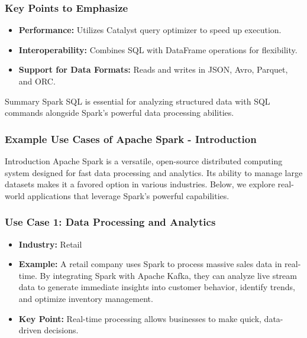 \documentclass[aspectratio=169]{beamer}
\begin{document}
\begin{frame}[fragile]
    \frametitle{Key Points to Emphasize}
    \begin{itemize}
        \item \textbf{Performance:} Utilizes Catalyst query optimizer to speed up execution.
        \item \textbf{Interoperability:} Combines SQL with DataFrame operations for flexibility.
        \item \textbf{Support for Data Formats:} Reads and writes in JSON, Avro, Parquet, and ORC.
    \end{itemize}
    
    \begin{block}{Summary}
        Spark SQL is essential for analyzing structured data with SQL commands alongside Spark's powerful data processing abilities.
    \end{block}
\end{frame}

\begin{frame}[fragile]
    \frametitle{Example Use Cases of Apache Spark - Introduction}
    \begin{block}{Introduction}
        Apache Spark is a versatile, open-source distributed computing system designed for fast data processing and analytics. 
        Its ability to manage large datasets makes it a favored option in various industries. 
        Below, we explore real-world applications that leverage Spark’s powerful capabilities.
    \end{block}
\end{frame}

\begin{frame}[fragile]
    \frametitle{Use Case 1: Data Processing and Analytics}
    \begin{itemize}
        \item \textbf{Industry:} Retail
        \item \textbf{Example:} 
            A retail company uses Spark to process massive sales data in real-time. 
            By integrating Spark with Apache Kafka, they can analyze live stream data to generate immediate insights into customer behavior, identify trends, and optimize inventory management.
        \item \textbf{Key Point:} Real-time processing allows businesses to make quick, data-driven decisions.
    \end{itemize}
\end{frame}
\end{document}
